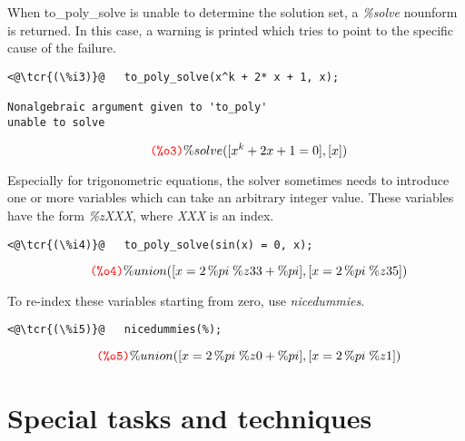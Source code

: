 \documentclass[../Maxima_Workbook.tex]{subfiles}
\begin{document}
When to\_poly\_solve is unable to determine the solution set, a \emph{\%solve} nounform is returned. In this case, a warning is printed which tries to point to the specific cause of the failure.

\lz \begin{small}
\color{blue} \leqn
\begin{lstlisting}
<@\tcr{(\%i3)}@   to_poly_solve(x^k + 2* x + 1, x);

Nonalgebraic argument given to 'to_poly'
unable to solve

\end{lstlisting}
\vspace{-5.5mm} \[\tag*{\tcr{\ttfamily (\%o3)}} \%solve([x^k + 2x + 1 = 0], [x]) \]
\color{black}
\end{small} \reqn
\vspace{-4mm} 

Especially for trigonometric equations, the solver sometimes needs to introduce one or more variables which can take an arbitrary integer value. These variables have the form \emph{\%zXXX}, where \emph{XXX} is an index.

\lz \begin{small}
\color{blue} \leqn
\begin{lstlisting}
<@\tcr{(\%i4)}@   to_poly_solve(sin(x) = 0, x);
\end{lstlisting}
\vspace{-5mm} \[\tag*{\tcr{\ttfamily (\%o4)}} \%union([x = 2 \, \%pi \; \%z33 + \%pi], [x = 2 \, \%pi \; \%z35]) \]
\color{black} \reqn
\end{small}
\vspace{-4mm} 

To re-index these variables starting from zero, use \emph{nicedummies}.

\lz \begin{small}
\color{blue} \leqn
\begin{lstlisting}
<@\tcr{(\%i5)}@   nicedummies(%);
\end{lstlisting}
\vspace{-5mm} \[\tag*{\tcr{\ttfamily (\%o5)}} \%union([x = 2 \, \%pi \; \%z0 + \%pi], [x = 2 \, \%pi \; \%z1]) \]
\color{black} \reqn
\end{small}
\vspace{-4mm} 

\section{Special tasks and techniques}
\end{document}
